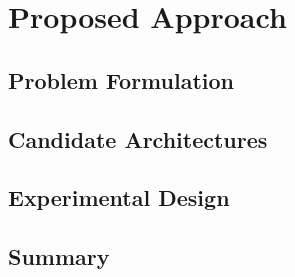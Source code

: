 \chapter{Proposed Approach}
\label{chap:proposed-approach}


\section{Problem Formulation}
\label{sec:pa-formulation}


\section{Candidate Architectures}
\label{sec:pa-architectures}


\section{Experimental Design}
\label{sec:pa-experimental-design}


\section{Summary}
\label{sec:pa-summary}
